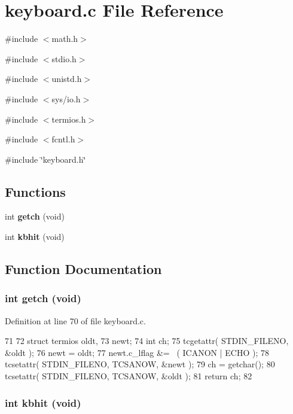 \section{keyboard.c File Reference}
\label{keyboard_8c}
{\ttfamily \#include $<$math.h$>$}\par
{\ttfamily \#include $<$stdio.h$>$}\par
{\ttfamily \#include $<$unistd.h$>$}\par
{\ttfamily \#include $<$sys/io.h$>$}\par
{\ttfamily \#include $<$termios.h$>$}\par
{\ttfamily \#include $<$fcntl.h$>$}\par
{\ttfamily \#include \char`\"{}keyboard.h\char`\"{}}\par
\subsection*{Functions}
\begin{DoxyCompactItemize}
\item 
int {\bf getch} (void)
\item 
int {\bf kbhit} (void)
\end{DoxyCompactItemize}


\subsection{Function Documentation}
\subsubsection[{getch}]{\setlength{\rightskip}{0pt plus 5cm}int getch (void)}\label{keyboard_8c_af5978fab9fa6dd4ced1c3a8ab1251f7b}


Definition at line 70 of file keyboard.c.


\begin{DoxyCode}
71 {
72         struct termios oldt,
73         newt;
74         int ch;
75         tcgetattr( STDIN_FILENO, &oldt );
76         newt = oldt;
77         newt.c_lflag &= ~( ICANON | ECHO );
78         tcsetattr( STDIN_FILENO, TCSANOW, &newt );
79         ch = getchar();
80         tcsetattr( STDIN_FILENO, TCSANOW, &oldt );
81         return ch;
82 }
\end{DoxyCode}
\subsubsection[{kbhit}]{\setlength{\rightskip}{0pt plus 5cm}int kbhit (void)}\label{keyboard_8c_a97e9b1fe8d4c010474637a654aad6566}


